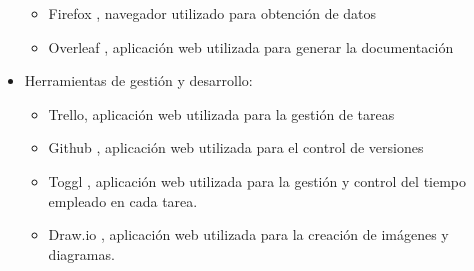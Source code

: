 \documentclass[11pt,a4paper,twoside,final]{article}
\begin{document}
\begin{itemize}
\begin{itemize}
        \item Firefox \cite{firefox}, navegador utilizado para obtención de datos
        \item Overleaf \cite{overleaf}, aplicación web utilizada para generar la documentación
    \end{itemize}
    \item Herramientas de gestión y desarrollo:
    \begin{itemize}
        \item Trello, aplicación web utilizada para la gestión de tareas
        \item Github \cite{github}, aplicación web utilizada para el control de versiones \cite{git}
        \item Toggl \cite{toggl}, aplicación web utilizada para la gestión y control del tiempo empleado en cada tarea.
        \item Draw.io \cite{drawio}, aplicación web utilizada para la creación de imágenes y diagramas.
    \end{itemize}
\end{itemize}

\newpage
{} %

\nocite{*} %
\printbibliography[title=Bibliografía]
\end{document}
